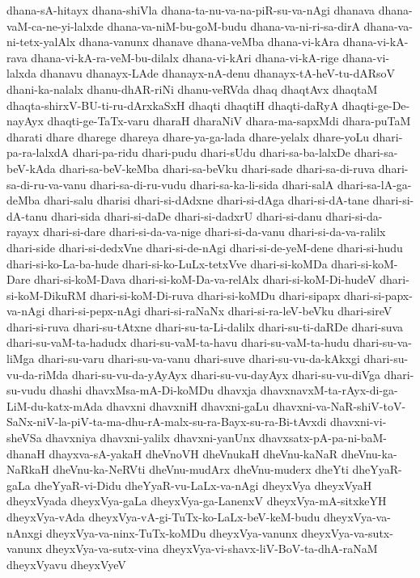 {dhana-sA-hitayx
dhana-shiVla
dhana-ta-nu-va-na-piR-su-va-nAgi
dhanava
dhana-vaM-ca-ne-yi-lalxde
dhana-va-niM-bu-goM-budu
dhana-va-ni-ri-sa-dirA
dhana-va-ni-tetx-yalAlx
dhana-vanunx
dhanave
dhana-veMba
dhana-vi-kAra
dhana-vi-kA-rava
dhana-vi-kA-ra-veM-bu-dilalx
dhana-vi-kAri
dhana-vi-kA-rige
dhana-vi-lalxda
dhanavu
dhanayx-LAde
dhanayx-nA-denu
dhanayx-tA-heV-tu-dARsoV
dhani-ka-nalalx
dhanu-dhAR-riNi
dhanu-veRVda
dhaq
dhaqtAvx
dhaqtaM
dhaqta-shirxV-BU-ti-ru-dArxkaSxH
dhaqti
dhaqtiH
dhaqti-daRyA
dhaqti-ge-De-nayAyx
dhaqti-ge-TaTx-varu
dharaH
dharaNiV
dhara-ma-sapxMdi
dhara-puTaM
dharati
dhare
dharege
dhareya
dhare-ya-ga-lada
dhare-yelalx
dhare-yoLu
dhari-pa-ra-lalxdA
dhari-pa-ridu
dhari-pudu
dhari-sUdu
dhari-sa-ba-lalxDe
dhari-sa-beV-kAda
dhari-sa-beV-keMba
dhari-sa-beVku
dhari-sade
dhari-sa-di-ruva
dhari-sa-di-ru-va-vanu
dhari-sa-di-ru-vudu
dhari-sa-ka-li-sida
dhari-salA
dhari-sa-lA-ga-deMba
dhari-salu
dharisi
dhari-si-dAdxne
dhari-si-dAga
dhari-si-dA-tane
dhari-si-dA-tanu
dhari-sida
dhari-si-daDe
dhari-si-dadxrU
dhari-si-danu
dhari-si-da-rayayx
dhari-si-dare
dhari-si-da-va-nige
dhari-si-da-vanu
dhari-si-da-va-ralilx
dhari-side
dhari-si-dedxVne
dhari-si-de-nAgi
dhari-si-de-yeM-dene
dhari-si-hudu
dhari-si-ko-La-ba-hude
dhari-si-ko-LuLx-tetxVve
dhari-si-koMDa
dhari-si-koM-Dare
dhari-si-koM-Dava
dhari-si-koM-Da-va-relAlx
dhari-si-koM-Di-hudeV
dhari-si-koM-DikuRM
dhari-si-koM-Di-ruva
dhari-si-koMDu
dhari-sipapx
dhari-si-papx-va-nAgi
dhari-si-pepx-nAgi
dhari-si-raNaNx
dhari-si-ra-leV-beVku
dhari-sireV
dhari-si-ruva
dhari-su-tAtxne
dhari-su-ta-Li-dalilx
dhari-su-ti-daRDe
dhari-suva
dhari-su-vaM-ta-hadudx
dhari-su-vaM-ta-havu
dhari-su-vaM-ta-hudu
dhari-su-va-liMga
dhari-su-varu
dhari-su-va-vanu
dhari-suve
dhari-su-vu-da-kAkxgi
dhari-su-vu-da-riMda
dhari-su-vu-da-yAyAyx
dhari-su-vu-dayAyx
dhari-su-vu-diVga
dhari-su-vudu
dhashi
dhavxMsa-mA-Di-koMDu
dhavxja
dhavxnavxM-ta-rAyx-di-ga-LiM-du-katx-mAda
dhavxni
dhavxniH
dhavxni-gaLu
dhavxni-va-NaR-shiV-toV-SaNx-niV-la-piV-ta-ma-dhu-rA-malx-su-ra-Bayx-su-ra-Bi-tAvxdi
dhavxni-vi-sheVSa
dhavxniya
dhavxni-yalilx
dhavxni-yanUnx
dhavxsatx-pA-pa-ni-baM-dhanaH
dhayxva-sA-yakaH
dheVnoVH
dheVnukaH
dheVnu-kaNaR
dheVnu-ka-NaRkaH
dheVnu-ka-NeRVti
dheVnu-mudArx
dheVnu-muderx
dheYti
dheYyaR-gaLa
dheYyaR-vi-Didu
dheYyaR-vu-LaLx-va-nAgi
dheyxVya
dheyxVyaH
dheyxVyada
dheyxVya-gaLa
dheyxVya-ga-LanenxV
dheyxVya-mA-sitxkeYH
dheyxVya-vAda
dheyxVya-vA-gi-TuTx-ko-LaLx-beV-keM-budu
dheyxVya-va-nAnxgi
dheyxVya-va-ninx-TuTx-koMDu
dheyxVya-vanunx
dheyxVya-va-sutx-vanunx
dheyxVya-va-sutx-vina
dheyxVya-vi-shavx-liV-BoV-ta-dhA-raNaM
dheyxVyavu
dheyxVyeV
}
